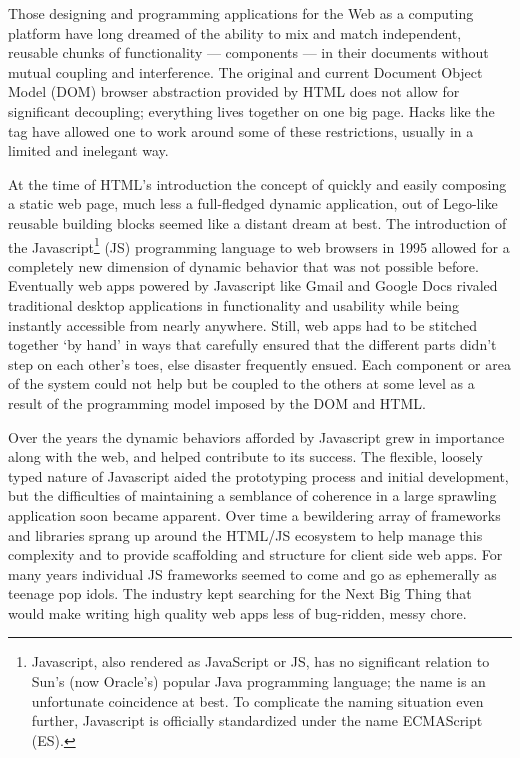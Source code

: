 Those designing and programming applications for the Web as a computing platform have long dreamed of the ability to mix and match independent, reusable chunks of functionality --- components --- in their documents without mutual coupling and interference. 
The original and current Document Object Model (DOM)
browser abstraction provided by HTML does not allow for significant decoupling; 
everything lives together on one big page. Hacks like the 
tag have allowed one to work around some of these restrictions, 
usually in a limited and inelegant way.

At the time of HTML's introduction the concept of quickly and easily composing a static web page, 
much less a full-fledged dynamic application, 
out of Lego-like reusable building blocks seemed like a distant dream at best. 
The introduction of the Javascript\footnote{Javascript, also rendered as JavaScript or JS, 
has no significant relation to Sun's (now Oracle's) popular Java programming language;
the name is an unfortunate coincidence at best. 
To complicate the naming situation even further, Javascript is officially standardized under the name ECMAScript (ES).}
(JS) programming language to web browsers in 1995 allowed for a completely new dimension of dynamic behavior that was not possible before.
Eventually web apps powered by Javascript like Gmail and Google Docs rivaled traditional desktop applications in functionality and usability while being instantly accessible from nearly anywhere.
Still, web apps had to be stitched together `by hand' in ways that carefully ensured that the different parts didn't step on each other's toes, else disaster frequently ensued. 
Each component or area of the system could not help but be coupled to the others at some level as a result of the programming model imposed by the DOM and HTML.

Over the years the dynamic behaviors afforded by Javascript grew in importance along with the web, and helped contribute to its success. 
The flexible, loosely typed nature of Javascript aided the prototyping process and initial development,
but the difficulties of maintaining a semblance of coherence in a large sprawling application soon became apparent.
Over time a bewildering array of frameworks and libraries sprang up around the HTML/JS ecosystem to help manage this complexity and to provide scaffolding and structure for client side web apps.
For many years individual JS frameworks seemed to come and go as ephemerally as teenage pop idols. 
The industry kept searching for the Next Big Thing that would make writing high quality web apps less of bug-ridden, messy chore. 

